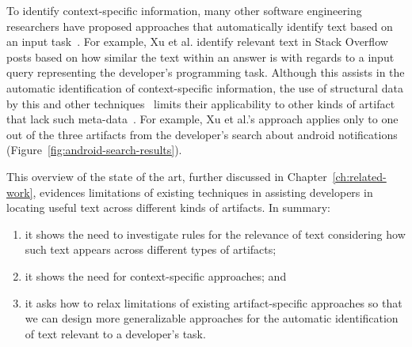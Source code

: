 To identify context-specific information, 
many other software engineering researchers 
have proposed approaches that 
automatically identify text based on an input task~\cite{Ye2016, silva2019, Xu2017}.
For example, Xu et al. identify relevant text in Stack Overflow posts 
based on how similar the text within an answer is with regards to a input query representing the developer's programming task.
Although this assists in the automatic identification of context-specific information, 
the use of structural data by this and other techniques~\cite{silva2019, Li2018}
limits their applicability to other kinds of artifact  that lack such meta-data~\cite{Bavota2016, arnaoudova2015}.
For example, Xu et al.'s approach
applies only to one out of the three artifacts 
from the developer's search 
about android notifications (Figure~\ref{fig:android-search-results}).



  




This overview of the state of the art, further discussed in Chapter~\ref{ch:related-work}, evidences limitations of existing techniques 
in assisting developers in locating useful text across different kinds of artifacts.
In summary:

\begin{enumerate}
    \item it shows the need to investigate rules for the relevance of text 
    considering how such text appears across different types of artifacts;
    \item it shows the need for context-specific approaches; and 
    \item it asks how to relax limitations of existing
    artifact-specific approaches so that we can design 
    more generalizable approaches for the automatic identification
    of text relevant to a developer's task.
\end{enumerate}


